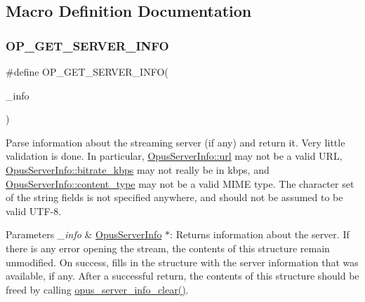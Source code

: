 \subsection{Macro Definition Documentation}
\mbox{\label{group__url__options_gacc2e4b086bee832d5d66caf18fd7d659}} 
\subsubsection{\texorpdfstring{O\+P\+\_\+\+G\+E\+T\+\_\+\+S\+E\+R\+V\+E\+R\+\_\+\+I\+N\+FO}{OP\_GET\_SERVER\_INFO}}
{\footnotesize\ttfamily \#define O\+P\+\_\+\+G\+E\+T\+\_\+\+S\+E\+R\+V\+E\+R\+\_\+\+I\+N\+FO(\begin{DoxyParamCaption}\item[{}]{\+\_\+info }\end{DoxyParamCaption})}

Parse information about the streaming server (if any) and return it. Very little validation is done. In particular, \hyperlink{struct_opus_server_info_a7f9aef47413c849bb240ef70394401b1}{Opus\+Server\+Info\+::url} may not be a valid U\+RL, \hyperlink{struct_opus_server_info_a1cf5db210f1cad5cf809bf54ddff68de}{Opus\+Server\+Info\+::bitrate\+\_\+kbps} may not really be in kbps, and \hyperlink{struct_opus_server_info_a5f0120b006af1122cbdc72f3cbb68fd7}{Opus\+Server\+Info\+::content\+\_\+type} may not be a valid M\+I\+ME type. The character set of the string fields is not specified anywhere, and should not be assumed to be valid U\+T\+F-\/8. 
\begin{DoxyParams}{Parameters}
{\em \+\_\+info} & \hyperlink{struct_opus_server_info}{Opus\+Server\+Info} $\ast$\+: Returns information about the server. If there is any error opening the stream, the contents of this structure remain unmodified. On success, fills in the structure with the server information that was available, if any. After a successful return, the contents of this structure should be freed by calling \hyperlink{group__url__options_ga096536e460277fe890acb265d8fdbd63}{opus\+\_\+server\+\_\+info\+\_\+clear()}. \\
\hline
\end{DoxyParams}
\mbox{\label{group__url__options_gab3b517acdb74c0d0b51800af86a58876}} 
